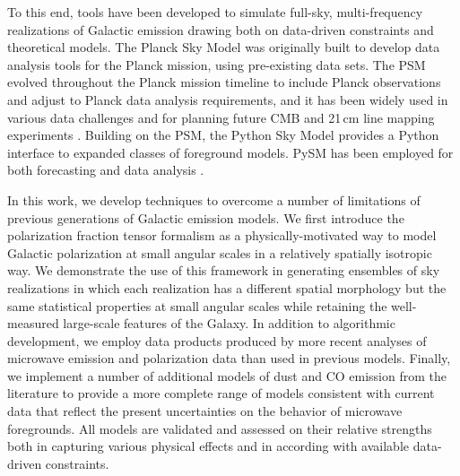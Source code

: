 \documentclass[twocolumn]{aastex631}
\begin{document}
To this end, tools have been developed to simulate full-sky, multi-frequency realizations of Galactic emission drawing both on data-driven constraints and theoretical models. The Planck Sky Model \citep[PSM;][]{delabrouille2012} was originally built to develop data analysis tools for the Planck mission, using pre-existing data sets. The PSM evolved throughout the Planck mission timeline to include Planck observations and adjust to Planck data analysis requirements, and it has been widely used in various data challenges and for planning future CMB and 21\,cm line mapping experiments \citep[e.g.,][]{Remazeilles:2018, Fornazier:2022, Ghosh:2022}. Building on the PSM, the Python Sky Model \citep[PySM;][]{Thorne:2017} provides a Python interface to expanded classes of foreground models. PySM has been employed for both forecasting \citep[e.g.,][]{Abazajian:2022, Hensley:2022, CCAT-PrimeCollaboration:2023, Wolz:2024} and data analysis \citep[e.g.,][]{Vacher:2023, SPIDERCollaboration:2024}.

In this work, we develop techniques to overcome a number of limitations of previous generations of Galactic emission models. We first introduce the polarization fraction tensor formalism as a physically-motivated way to model Galactic polarization at small angular scales in a relatively spatially isotropic way. We demonstrate the use of this framework in generating ensembles of sky realizations in which each realization has a different spatial morphology but the same statistical properties at small angular scales while retaining the well-measured large-scale features of the Galaxy. In addition to algorithmic development, we employ data products produced by more recent analyses of microwave emission and polarization data than used in previous models. Finally, we implement a number of additional models of dust and CO emission from the literature to provide a more complete range of models consistent with current data that reflect the present uncertainties on the behavior of microwave foregrounds. All models are validated and assessed on their relative strengths both in capturing various physical effects and in according with available data-driven constraints.

\end{document}
